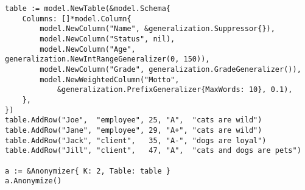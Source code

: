 \begin{lstlisting}[caption=Example run,label=lst:example_run,float,floatplacement=H]
table := model.NewTable(&model.Schema{
    Columns: []*model.Column{
        model.NewColumn("Name", &generalization.Suppressor{}),
        model.NewColumn("Status", nil),
        model.NewColumn("Age", generalization.NewIntRangeGeneralizer(0, 150)),
        model.NewColumn("Grade", generalization.GradeGeneralizer()),
        model.NewWeightedColumn("Motto",
            &generalization.PrefixGeneralizer{MaxWords: 10}, 0.1),
    },
})
table.AddRow("Joe",  "employee", 25, "A",  "cats are wild")
table.AddRow("Jane", "employee", 29, "A+", "cats are wild")
table.AddRow("Jack", "client",   35, "A-", "dogs are loyal")
table.AddRow("Jill", "client",   47, "A",  "cats and dogs are pets")

a := &Anonymizer{ K: 2, Table: table }
a.Anonymize()
\end{lstlisting}
